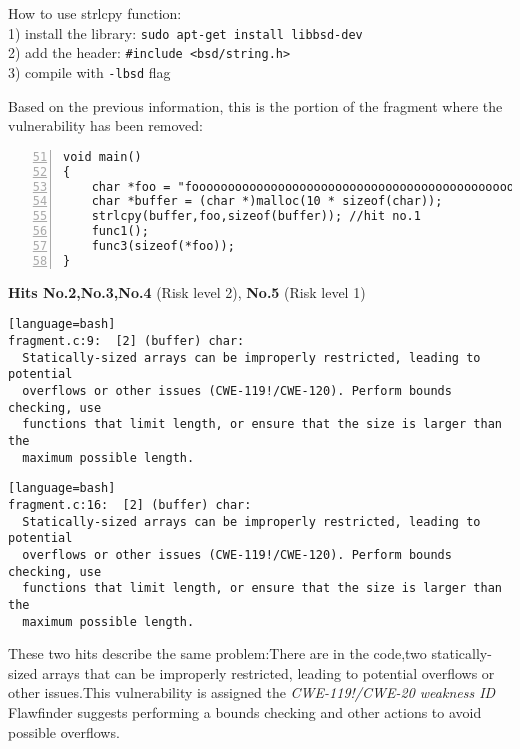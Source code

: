 \documentclass[a4paper,12pt]{article}
\newenvironment{SpecialPar}
  {\begin{shaded}}
  {\end{shaded}}
\begin{document}
\begin{SpecialPar}

\noindent
How to use strlcpy function:\\
 1) install the library: \texttt{sudo apt-get install libbsd-dev}\\
 2) add the header: \texttt{\#include <bsd/string.h>}\\
 3) compile with \texttt{-lbsd} flag\\
\end{SpecialPar}
\noindent
Based on the previous information, this is the portion of the fragment where the vulnerability has been removed:
\begin{lstlisting}[style=c,numbers=left,firstnumber=51,linebackgroundcolor={\ifnum\value{lstnumber}=55\color{green}\fi}]
void main()
{
	char *foo = "fooooooooooooooooooooooooooooooooooooooooooooooooooo";
	char *buffer = (char *)malloc(10 * sizeof(char));
	strlcpy(buffer,foo,sizeof(buffer)); //hit no.1
	func1();
	func3(sizeof(*foo));
}
\end{lstlisting}

\break
\textbf{Hits No.2,No.3,No.4} (Risk level 2), \textbf{No.5} (Risk level 1)

\begin{lstlisting}[style=DOS][language=bash]
fragment.c:9:  [2] (buffer) char:
  Statically-sized arrays can be improperly restricted, leading to potential
  overflows or other issues (CWE-119!/CWE-120). Perform bounds checking, use
  functions that limit length, or ensure that the size is larger than the
  maximum possible length.
\end{lstlisting}

\begin{lstlisting}[style=DOS][language=bash]
fragment.c:16:  [2] (buffer) char:
  Statically-sized arrays can be improperly restricted, leading to potential
  overflows or other issues (CWE-119!/CWE-120). Perform bounds checking, use
  functions that limit length, or ensure that the size is larger than the
  maximum possible length.
\end{lstlisting}
These two hits describe the same problem:There are in the code,two statically-sized arrays that can be improperly restricted, leading to potential overflows or other issues.This vulnerability is assigned the \textit{CWE-119!/CWE-20 weakness ID}\cite{CWE}	\\
Flawfinder suggests performing a bounds checking and other actions to avoid possible overflows.
\end{document}

